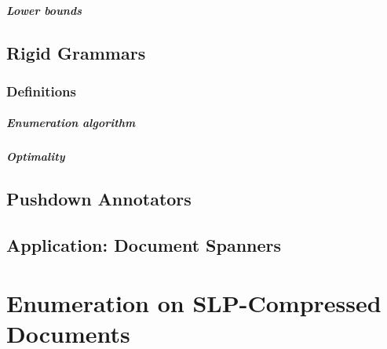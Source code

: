 \documentclass[pdftex]{pucthesis}	%
\begin{document}
\paragraph{Lower bounds}


\section{Rigid Grammars} \label{gram:sec:quadratic}


\subsection{Definitions}
\label{gram:sec:profile}


\paragraph{Enumeration algorithm}


\paragraph{Optimality}


\section{Pushdown Annotators} \label{gram:sec:linear}



\section{Application: Document Spanners} \label{gram:sec:spanners}

 




\chapter[ENUMERATION ON SLP-COMPRESSED DOCUMENTS]{Enumeration on SLP-Compressed Documents} \label{ch3}
\end{document}
